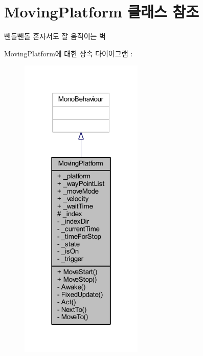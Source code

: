 \hypertarget{class_moving_platform}{}\section{Moving\+Platform 클래스 참조}
\label{class_moving_platform}


뺀돌뺀돌 혼자서도 잘 움직이는 벽  




Moving\+Platform에 대한 상속 다이어그램 \+: 
\nopagebreak
\begin{figure}[H]
\begin{center}
\leavevmode
\includegraphics[width=166pt]{d8/ddd/class_moving_platform__inherit__graph}
\end{center}
\end{figure}


